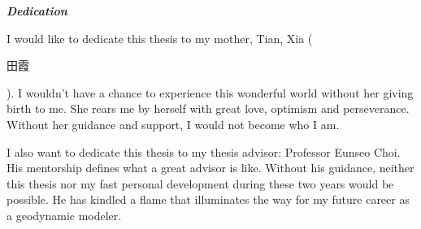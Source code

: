 \begin{center}
\textbf{\textit{\large{Dedication}}}
\end{center}

I would like to dedicate this thesis to my mother, Tian, Xia (\begin{CJK}{UTF8}{gbsn}田霞\end{CJK}). I wouldn't have a chance to experience this wonderful world without her giving birth to me. She rears me by herself with great love, optimism and perseverance. Without her guidance and support, I would not become who I am.

I also want to dedicate this thesis to my thesis advisor: Professor Eunseo Choi. His mentorship defines what a great advisor is like. Without his guidance, neither this thesis nor my fast personal development during these two years would be possible. He has kindled a flame that illuminates the way for my future career as a geodynamic modeler.   

